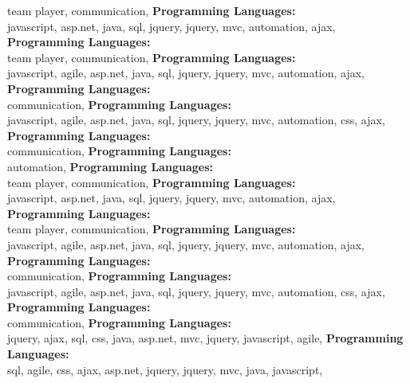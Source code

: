 team player,  communication, \textbf{Programming Languages:} \\
javascript, asp.net, java, sql,  jquery, jquery, mvc, automation, ajax, \textbf{Programming Languages:} \\
team player,  communication, \textbf{Programming Languages:} \\
javascript, agile, asp.net, java, sql,  jquery, jquery, mvc, automation, ajax, \textbf{Programming Languages:} \\
 communication, \textbf{Programming Languages:} \\
javascript, agile, asp.net, java, sql,  jquery, jquery, mvc, automation, css, ajax, \textbf{Programming Languages:} \\
 communication, \textbf{Programming Languages:} \\
automation, \textbf{Programming Languages:} \\
team player,  communication, \textbf{Programming Languages:} \\
javascript, asp.net, java, sql,  jquery, jquery, mvc, automation, ajax, \textbf{Programming Languages:} \\
team player,  communication, \textbf{Programming Languages:} \\
javascript, agile, asp.net, java, sql,  jquery, jquery, mvc, automation, ajax, \textbf{Programming Languages:} \\
 communication, \textbf{Programming Languages:} \\
javascript, agile, asp.net, java, sql,  jquery, jquery, mvc, automation, css, ajax, \textbf{Programming Languages:} \\
 communication, \textbf{Programming Languages:} \\
 jquery, ajax, sql, css, java, asp.net, mvc, jquery, javascript, agile, \textbf{Programming Languages:} \\
sql, agile, css, ajax, asp.net,  jquery, jquery, mvc, java, javascript, 